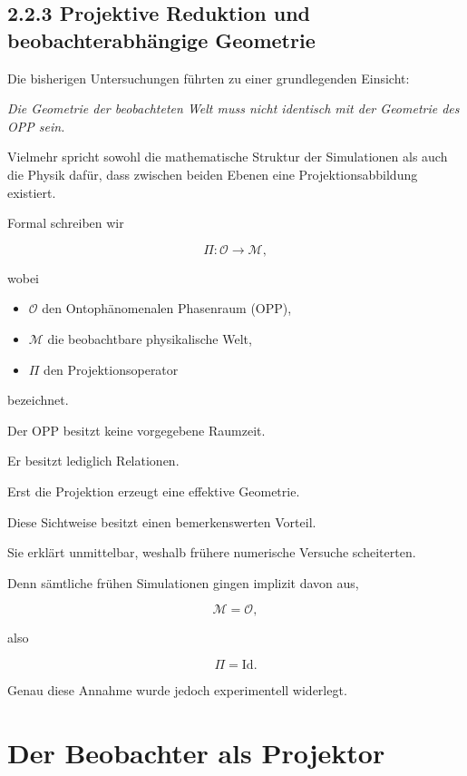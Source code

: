 \subsection{2.2.3 Projektive Reduktion und beobachterabhängige Geometrie}

Die bisherigen Untersuchungen führten zu einer grundlegenden Einsicht:

\begin{center}
\emph{Die Geometrie der beobachteten Welt muss nicht identisch mit der Geometrie des OPP sein.}
\end{center}

Vielmehr spricht sowohl die mathematische Struktur der Simulationen als auch die Physik dafür, dass zwischen beiden Ebenen eine Projektionsabbildung existiert.

Formal schreiben wir

\[
\Pi :
\mathcal{O}
\longrightarrow
\mathcal{M},
\]

wobei

\begin{itemize}
\item
\(\mathcal{O}\) den Ontophänomenalen Phasenraum (OPP),

\item
\(\mathcal{M}\) die beobachtbare physikalische Welt,

\item
\(\Pi\) den Projektionsoperator
\end{itemize}

bezeichnet.

Der OPP besitzt keine vorgegebene Raumzeit.

Er besitzt lediglich Relationen.

Erst die Projektion erzeugt eine effektive Geometrie.

\bigskip

Diese Sichtweise besitzt einen bemerkenswerten Vorteil.

Sie erklärt unmittelbar, weshalb frühere numerische Versuche scheiterten.

Denn sämtliche frühen Simulationen gingen implizit davon aus,

\[
\mathcal{M}
=
\mathcal{O},
\]

also

\[
\Pi
=
\mathrm{Id}.
\]

Genau diese Annahme wurde jedoch experimentell widerlegt.

\section*{Der Beobachter als Projektor}

